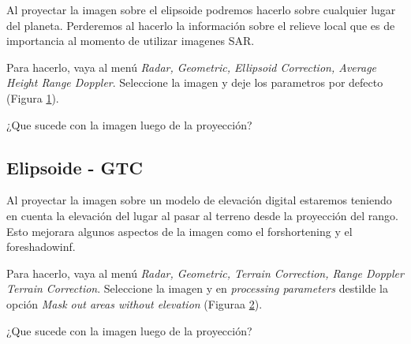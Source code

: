 Al proyectar la imagen sobre el elipsoide podremos hacerlo sobre cualquier lugar del planeta. Perderemos al hacerlo la información sobre el relieve local que es de importancia al momento de utilizar imagenes SAR.

Para hacerlo, vaya al menú \emph{Radar, Geometric, Ellipsoid Correction, Average Height Range Doppler}. Seleccione la imagen  y deje los parametros por defecto (Figura \ref{fig:elipsoide}).

\begin{figure}[h!]
    \centering
    \hfill
    \caption{}
    \label{fig:elipsoide}
\end{figure}

\begin{que}
    ¿Que sucede con la imagen luego de la proyección?
\end{que}

\subsection{Elipsoide - GTC}

Al proyectar la imagen sobre un modelo de elevación digital estaremos teniendo en cuenta la elevación del lugar al pasar al terreno desde la proyección del rango. Esto mejorara algunos aspectos de la imagen como el forshortening y el foreshadowinf.

Para hacerlo, vaya al menú \emph{Radar, Geometric, Terrain Correction, Range Doppler Terrain Correction}. Seleccione la imagen  y en \emph{processing parameters} destilde la opción \emph{Mask out areas without elevation} (Figuraa \ref{fig:gtc}).

\begin{figure}[h!]
    \centering
    \hfill
    \caption{}
    \caption{}
    \label{fig:gtc}
\end{figure}

\begin{que}
    ¿Que sucede con la imagen luego de la proyección?
\end{que}

